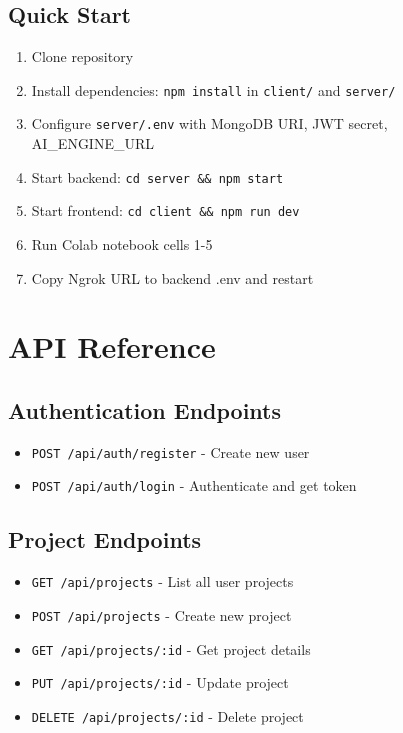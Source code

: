 \documentclass[11pt,a4paper]{article}
\begin{document}
\subsection{Quick Start}
\begin{enumerate}[noitemsep]
    \item Clone repository
    \item Install dependencies: \texttt{npm install} in \texttt{client/} and \texttt{server/}
    \item Configure \texttt{server/.env} with MongoDB URI, JWT secret, AI\_ENGINE\_URL
    \item Start backend: \texttt{cd server \&\& npm start}
    \item Start frontend: \texttt{cd client \&\& npm run dev}
    \item Run Colab notebook cells 1-5
    \item Copy Ngrok URL to backend .env and restart
\end{enumerate}

\section{API Reference}

\subsection{Authentication Endpoints}
\begin{itemize}[noitemsep]
    \item \texttt{POST /api/auth/register} - Create new user
    \item \texttt{POST /api/auth/login} - Authenticate and get token
\end{itemize}

\subsection{Project Endpoints}
\begin{itemize}[noitemsep]
    \item \texttt{GET /api/projects} - List all user projects
    \item \texttt{POST /api/projects} - Create new project
    \item \texttt{GET /api/projects/:id} - Get project details
    \item \texttt{PUT /api/projects/:id} - Update project
    \item \texttt{DELETE /api/projects/:id} - Delete project
\end{itemize}
\end{document}
